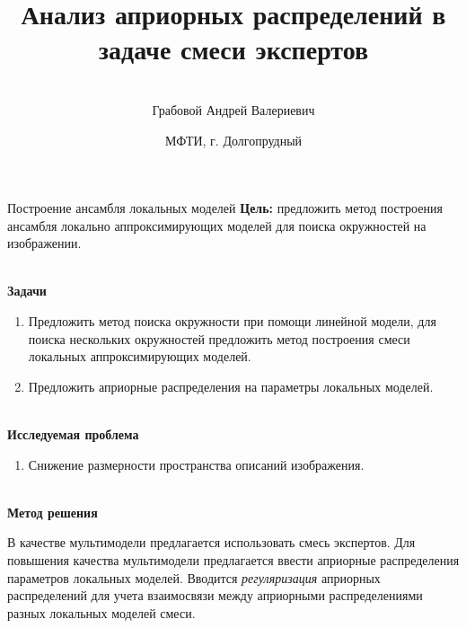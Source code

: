 \documentclass[9pt,pdf,hyperref={unicode}]{beamer}
\title[\hbox to 56mm{Смеси экспертов \hfill\insertframenumber\,/\,\inserttotalframenumber}]
{Анализ априорных распределений в задаче смеси экспертов}
\author[А.\,В.~Грабовой]{\large \\Грабовой Андрей Валериевич}
\institute{\large
Московский физико-технический институт}
\date{\footnotesize{МФТИ, г. Долгопрудный}}
\begin{document}
\begin{frame}
\titlepage
\end{frame}

\begin{frame}{Построение ансамбля локальных моделей}
\justifying
\textbf{Цель:} предложить метод построения ансамбля локально аппроксимирующих моделей для поиска окружностей на изображении.

~\\
\textbf{Задачи}

\begin{enumerate}
\justifying
	\item Предложить метод поиска окружности при помощи линейной модели, для поиска нескольких окружностей предложить метод построения смеси локальных аппроксимирующих моделей.
	\item Предложить априорные распределения на параметры локальных моделей.
\end{enumerate}

~\\
\textbf{Исследуемая проблема}
\begin{enumerate}
\justifying
	\item Снижение размерности пространства описаний изображения.
\end{enumerate}

~\\
\textbf{Метод решения}

	В качестве мультимодели предлагается использовать смесь экспертов. Для повышения качества мультимодели предлагается ввести априорные распределения параметров локальных моделей. Вводится \textit{регуляризация} априорных распределений для учета взаимосвязи между априорными распределениями разных локальных моделей смеси.
	
\end{frame}
\end{document}
